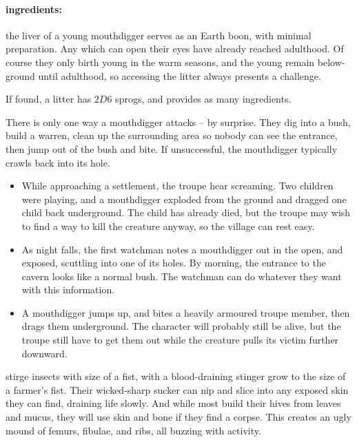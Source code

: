 \begin{multicols}{2}
\paragraph{\Glspl{ingredient}:}
the liver of a young mouthdigger serves as an Earth \gls{boon}, with minimal preparation.
Any which can open their eyes have already reached adulthood.
Of course they only birth young in the warm seasons, and the young remain below-ground until adulthood, so accessing the litter always presents a challenge.

If found, a litter has $2D6$ sprogs, and provides as many \glspl{ingredient}.

\showEnc
There is only one way a mouthdigger attacks -- by surprise.  They dig into a bush, build a warren, clean up the surrounding area so nobody can see the entrance, then jump out of the bush and bite.  If unsuccessful, the mouthdigger typically crawls back into its hole.

\begin{itemize}

  \item
  While approaching a settlement, the troupe hear screaming.
  Two children were playing, and a mouthdigger exploded from the ground and dragged one child back underground.
  The child has already died, but the troupe may wish to find a way to kill the creature anyway, so the \gls{village} can rest easy.
  \item
  As night falls, the first watchman notes a mouthdigger out in the open, and exposed, scuttling into one of its holes.
  By morning, the entrance to the cavern looks like a normal bush.
  The watchman can do whatever they want with this information.
  \item
  A mouthdigger jumps up, and bites a heavily armoured troupe member, then drags them underground.
  The character will probably still be alive, but the troupe still have to get them out while the creature pulls its victim further downward.

\end{itemize}

\mouthdigger

  {stirge}%
  {insects with size of a fist, with a blood-draining stinger}%
grow to the size of a farmer's fist.
Their wicked-sharp sucker can nip and slice into any exposed skin they can find, draining life slowly.
And while most build their hives from leaves and mucus, they will use skin and bone if they find a corpse.
This creates an ugly mound of femurs, fibulae, and ribs, all buzzing with activity.


\end{multicols}
